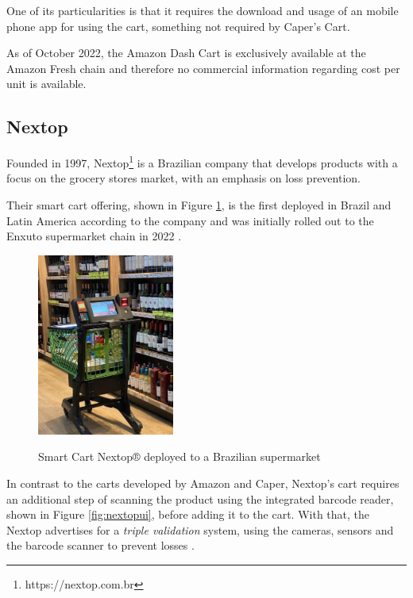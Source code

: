 One of its particularities is that it requires the download and usage of an mobile phone
app for using the cart, something not required by Caper's Cart.

As of October 2022, the Amazon Dash Cart is exclusively available at the Amazon
Fresh chain and therefore no commercial information regarding cost per unit is
available.

\subsection{Nextop}

Founded in 1997, Nextop\footnote{https://nextop.com.br} is a Brazilian company
that develops products with a focus on the grocery stores market, with an emphasis on
loss prevention.

Their smart cart offering, shown in Figure \ref{fig:nextop}, is the first
deployed in Brazil and Latin America according to the company and was
initially rolled out to the Enxuto supermarket chain in 2022
\cite{Paraiba2022}.

\begin{figure}[H]
	\centering
	\caption[Smart Cart Nextop® deployed to a Brazilian supermarket]{Smart Cart Nextop® deployed to a Brazilian supermarket}
	\includegraphics[width=0.4\textwidth]{./images/nextop.jpeg}
	\label{fig:nextop}
\end{figure}

In contrast to the carts developed by Amazon and Caper, Nextop's cart requires
an additional step of scanning the product using the integrated barcode reader,
shown in Figure \ref{fig:nextopui}, before adding it to the cart. With that, the
Nextop advertises for a \textit{triple validation} system, using the cameras,
sensors and the barcode scanner to prevent losses \cite{Nextop2022}.

